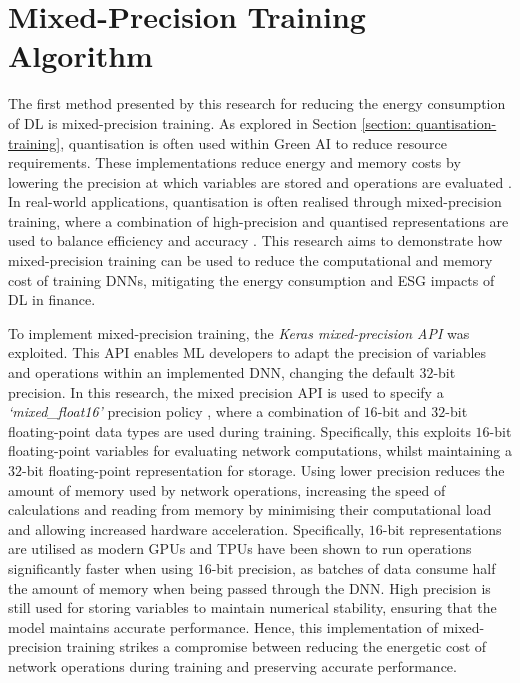 \documentclass[a4paper, 11pt]{report}
\begin{document}
    \section{Mixed-Precision Training Algorithm}
    \label{section: mixed-precision-method}

    The first method presented by this research for reducing the energy consumption of DL is mixed-precision training. As explored in Section \ref{section: quantisation-training}, quantisation is often used within Green AI to reduce resource requirements. These implementations reduce energy and memory costs by lowering the precision at which variables are stored and operations are evaluated \citep{fan-2020b}. In real-world applications, quantisation is often realised through mixed-precision training, where a combination of high-precision and quantised representations are used to balance efficiency and accuracy \citep{ott-2017}. This research aims to demonstrate how mixed-precision training can be used to reduce the computational and memory cost of training DNNs, mitigating the energy consumption and ESG impacts of DL in finance.

    To implement mixed-precision training, the \emph{Keras mixed-precision API} \citep{abadi-2016} was exploited. This API enables ML developers to adapt the precision of variables and operations within an implemented DNN, changing the default $32$-bit precision. In this research, the mixed precision API is used to specify a \emph{`mixed\_float16'} precision policy \citep{abadi-2016}, where a combination of $16$-bit and $32$-bit floating-point data types are used during training. Specifically, this exploits $16$-bit floating-point variables for evaluating network computations, whilst maintaining a $32$-bit floating-point representation for storage. Using lower precision reduces the amount of memory used by network operations, increasing the speed of calculations and reading from memory by minimising their computational load and allowing increased hardware acceleration. Specifically, $16$-bit representations are utilised as modern GPUs and TPUs have been shown to run operations significantly faster when using $16$-bit precision, as batches of data consume half the amount of memory when being passed through the DNN. High precision is still used for storing variables to maintain numerical stability, ensuring that the model maintains accurate performance. Hence, this implementation of mixed-precision training strikes a compromise between reducing the energetic cost of network operations during training and preserving accurate performance.
\end{document}
